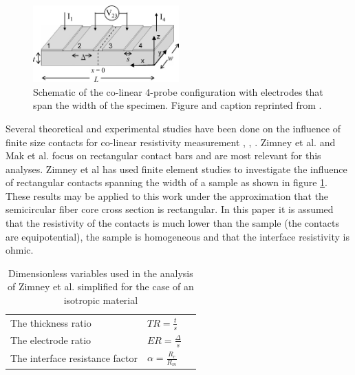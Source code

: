  
\begin{figure}[h]
  \centering
    \includegraphics[width=0.5\textwidth]{fig/4pp/finite_size_contacts.png}
 \caption{Schematic of the co-linear 4-probe configuration with electrodes that span the width of the specimen. Figure and caption reprinted from \cite{Zimney2007CorrectionStudy}.}
\label{fig1}
\end{figure}
 
   
 
 Several theoretical and experimental studies have been done on the influence of finite size contacts for co-linear resistivity measurement \cite{Zimney2007CorrectionStudy}, \cite{Mak1989SpecificArsenide}, \cite{Ilse2014GeometricalMeasurements}. Zimney et al. and Mak et al. focus on rectangular contact bars and are most relevant for this analyses. Zimney et al has used finite element studies to investigate the influence of rectangular contacts spanning the width of a sample as shown in figure \ref{fig1}. These results may be applied to this work under the approximation that the semicircular fiber core cross section is rectangular. In this paper it is assumed that the resistivity of the contacts is much lower than the sample (the contacts are equipotential), the sample is homogeneous and that the interface resistivity is ohmic.  %
 \begin{table}[b]
\begin{center}
    \begin{tabular}{|l|l|l|  }
    \hline
     The thickness ratio & $TR = \frac{t}{s}$ \\ 
     The electrode ratio & $ER =  \frac{\Delta}{s}$ \\ 
     The interface resistance factor & $\alpha = \frac{R_c}{R_m}$ \\
     \hline
    \end{tabular}
\end{center}
\caption{Dimensionless variables used in the analysis of Zimney et al. simplified for the case of an isotropic material \cite{Zimney2007CorrectionStudy}}
\label{Tab1}
\end{table}
 

